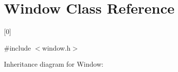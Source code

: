 \hypertarget{classWindow}{}\section{Window Class Reference}
\label{classWindow}


\mbox{[}0\mbox{]}  




{\ttfamily \#include $<$window.\+h$>$}



Inheritance diagram for Window\+:
